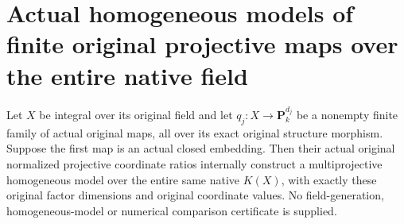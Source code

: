\section{Actual homogeneous models of finite original projective maps over the entire native field}
\label{sec:finite-projective-native-field-models}

\begin{theorem}
\label{thm:finite-projective-native-field-models}
\leanok
{}
Let $X$ be integral over its original field and let
$q_j:X\to\mathbf P^{d_j}_k$ be a nonempty finite family of
actual original maps, all over its exact original structure
morphism. Suppose the first map is an actual closed embedding.
Then their actual original normalized projective coordinate
ratios internally construct a multiprojective homogeneous
model over the entire same native $K(X)$, with exactly these
original factor dimensions and original coordinate values.
No field-generation, homogeneous-model or numerical comparison
certificate is supplied.
\end{theorem}

